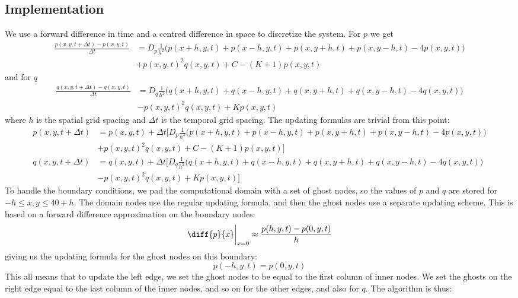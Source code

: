 \documentclass[a4paper,10pt]{article}
\begin{document}
	\subsection*{Implementation}
	We use a forward difference in time and a centred difference in space to discretize the system. For $ p $ we get
	\begin{align*}
		\frac{p(x, y, t+\Delta t) - p(x,y,t)}{\Delta t} &= D_p \frac{1}{h^2}\Big(p(x+h, y, t) + p(x-h, y, t) + p(x, y+h, t) + p(x, y-h, t) - 4p(x, y, t)\Big) \\
		&+ p(x,y,t)^2q(x,y,t) + C - (K+1) p(x,y,t)
	\end{align*}
	and for $ q $
	\begin{align*}
		\frac{q(x, y, t+\Delta t) - q(x,y,t)}{\Delta t} &= D_q \frac{1}{h^2}\Big(q(x+h, y, t) +q(x-h, y, t) + q(x, y+h, t) + q(x, y-h, t) - 4q(x, y, t)\Big) \\
		&- p(x,y,t)^2q(x,y,t) +K p(x,y,t)
	\end{align*}
	where $ h $ is the spatial grid spacing and $ \Delta t $ is the temporal grid spacing. The updating formulas are trivial from this point:
	\begin{align}
	p(x,y,t+\Delta t) &=p(x,y,t) + \Delta t \bigg[ D_p \frac{1}{h^2}\Big(p(x+h, y, t) + p(x-h, y, t) + p(x, y+h, t) + p(x, y-h, t) - 4p(x, y, t)\Big) \nonumber \\
	&+ p(x,y,t)^2q(x,y,t) + C - (K+1) p(x,y,t)\bigg] \label{eq:p_update}\\
	q(x,y,t+\Delta t) &=q(x,y,t) + \Delta t \bigg[ D_q \frac{1}{h^2}\Big(q(x+h, y, t) +q(x-h, y, t) + q(x, y+h, t) + q(x, y-h, t) - 4q(x, y, t)\Big) \nonumber\\
	&- p(x,y,t)^2q(x,y,t) +K p(x,y,t) \bigg] \label{eq:q_update}
	\end{align}
	To handle the boundary conditions, we pad the computational domain with a set of ghost nodes, so the values of $ p $ and $ q $ are stored for $ -h \leq x,y \leq 40+h $. The domain nodes use the regular updating formula, and then the ghost nodes use a separate updating scheme. This is based on a forward difference approximation on the boundary nodes:
	\begin{equation}
		\diff{p}{x}\bigg|_{x=0} \approx \frac{p(h, y, t) - p(0, y, t)}{h} 
	\end{equation}
	giving us the updating formula for the ghost nodes on this boundary:
	\begin{equation}\label{eq:ghosts}
		p(-h,y,t) = p(0,y,t)
	\end{equation}
	This all means that to update the left edge, we set the ghost nodes to be equal to the first column of inner nodes. We set the ghosts on the right edge equal to the last column of the inner nodes, and so on for the other edges, and also for $ q $. The algorithm is thus:
\end{document}
